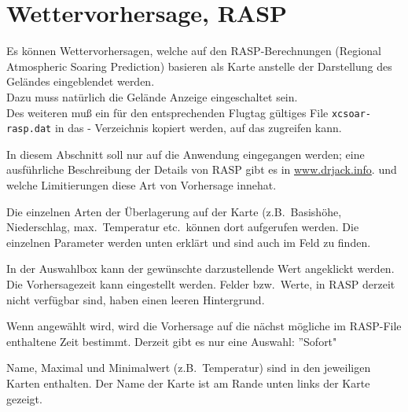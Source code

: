\section{Wettervorhersage, RASP}
Es können Wettervorhersagen, welche auf den RASP-Berechnungen (Regional Atmospheric
Soaring Prediction) basieren als Karte anstelle der Darstellung des Geländes eingeblendet werden. \\

Dazu muss natürlich die Gelände Anzeige eingeschaltet sein. \tip{} \\

Des weiteren muß ein für den entsprechenden Flugtag gültiges File \verb"xcsoar-rasp.dat"  in
das \xc - Verzeichnis kopiert werden, auf das  \xc zugreifen kann.

In diesem Abschnitt soll nur auf die Anwendung eingegangen werden; eine ausführliche
Beschreibung der Details von RASP gibt es in  \url{www.drjack.info}.
und welche Limitierungen diese Art von Vorhersage innehat.

Die einzelnen Arten der Überlagerung auf der Karte (z.B.\ Basishöhe, Niederschlag,
max.\ Temperatur etc.\  können dort aufgerufen werden.
Die einzelnen Parameter werden unten erklärt und sind auch im Feld  zu finden.

In der Auswahlbox kann der gewünschte darzustellende Wert angeklickt werden.
Die Vorhersagezeit kann eingestellt werden. Felder bzw.\ Werte, in RASP derzeit nicht verfügbar sind,
haben einen leeren Hintergrund.

 Wenn   angewählt wird, wird die Vorhersage auf die nächst mögliche im RASP-File
enthaltene Zeit bestimmt.  Derzeit gibt es nur eine Auswahl: ''Sofort"

Name, Maximal und Minimalwert (z.B.\ Temperatur) sind in den jeweiligen Karten enthalten.
Der Name der Karte ist am Rande unten links der Karte gezeigt.

